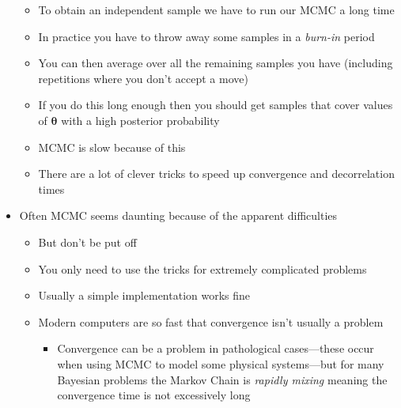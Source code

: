 \documentclass[11pt]{article}
\begin{document}
\begin{itemize}
\begin{itemize}
\item To obtain an independent sample we have to run our MCMC a long time
\item In practice you have to throw away some samples in a \emph{burn-in} period
\item You can then average over all the remaining samples you have (including
repetitions where you don't accept a move)
\item If you do this long enough then you should get samples that
cover values of \(\bm{\theta}\) with a high posterior probability
\item MCMC is slow because of this
\item There are a lot of clever tricks to speed up convergence and
decorrelation times
\end{itemize}
\item Often MCMC seems daunting because of the apparent difficulties
\begin{itemize}
\item But don't be put off
\item You only need to use the tricks for extremely complicated problems
\item Usually a simple implementation works fine
\item Modern computers are so fast that convergence isn't usually a problem
\begin{itemize}
\item Convergence can be a problem in pathological cases---these
occur when using MCMC to model some physical systems---but
for many Bayesian problems the Markov Chain is \emph{rapidly
mixing} meaning the convergence time is not excessively long
\end{itemize}
\end{itemize}
\end{itemize}
\end{document}
